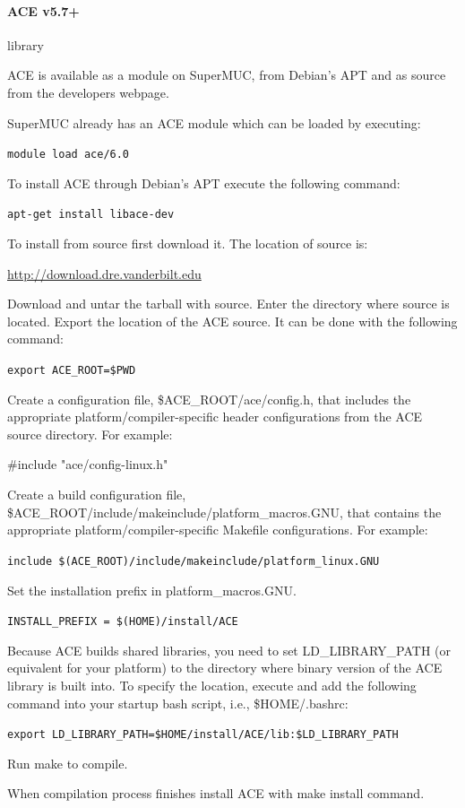 \documentclass[11pt,a4paper, oneside]{book} %
\newcommand{\aceurl}{\url{http://download.dre.vanderbilt.edu} }
\newcommand{\installloc}[1]{\$HOME/install/#1}
\begin{document}
\paragraph{ACE v5.7+} library

ACE is available as a module on SuperMUC, from Debian's APT and as source from
the developers webpage.

SuperMUC already has an ACE module which can be loaded by executing:

\texttt{module load ace/6.0}

To install ACE through Debian's APT execute the following command:

\texttt{apt-get install libace-dev}

To install from source first download it.
The location of source is:

\aceurl

Download and untar the tarball with source.
Enter the directory where source is located.
Export the location of the ACE source. It can be done with the following command:

\texttt{export ACE\_ROOT=\$PWD}

Create a configuration file, \$ACE\_ROOT/ace/config.h, that includes the
appropriate platform/compiler-specific header configurations from the ACE source
directory. For example:

\#include "ace/config-linux.h"

Create a build configuration file,
\$ACE\_ROOT/include/makeinclude/platform\_macros.GNU, that contains the
appropriate platform/compiler-specific Makefile configurations. For example:

\texttt{include \$(ACE\_ROOT)/include/makeinclude/platform\_linux.GNU}

Set the installation prefix in platform\_macros.GNU.

\texttt{INSTALL\_PREFIX = \$(HOME)/install/ACE}

Because ACE builds shared libraries, you need to set LD\_LIBRARY\_PATH (or
equivalent for your platform) to the directory where binary version of the ACE
library is built into. To specify the location, execute and add the following
command into your startup bash script, i.e., \$HOME/.bashrc:

\texttt{export LD\_LIBRARY\_PATH=\installloc{ACE/lib}:\$LD\_LIBRARY\_PATH}

Run make to compile.

When compilation process finishes install ACE with make install command.
\end{document}
